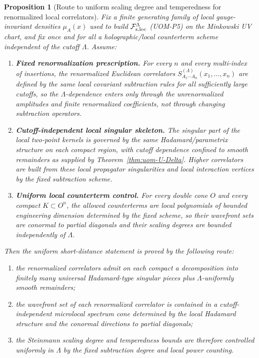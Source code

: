 \documentclass[10pt]{article}
\theoremstyle{definition}
\theoremstyle{plain}
\newtheorem{proposition}{Proposition}[section]
\begin{document}
\begin{proposition}[Route to uniform scaling degree and temperedness for renormalized local correlators]
\label{prop:uom-U-SD-route}
Fix a finite generating family of local gauge-invariant densities $\mu_A(x)$ used to build
$\mathcal F_{\rm s.loc}^\Lambda$ (UOM-P5) on the Minkowski UV chart, and fix once and for all a holographic/local counterterm scheme independent of
the cutoff $\Lambda$.  Assume:
\begin{enumerate}[label=\textnormal{(\roman*)},leftmargin=2.2em,itemsep=1pt]
\item \textbf{Fixed renormalization prescription.}
For every $n$ and every multi-index of insertions, the renormalized Euclidean correlators
\(
S^{(\Lambda)}_{A_1\cdots A_n}(x_1,\ldots,x_n)
\)
are defined by the same local covariant subtraction rules for all sufficiently large cutoffs, so the $\Lambda$-dependence enters only through the
unrenormalized amplitudes and finite renormalized coefficients, not through changing subtraction operators.
\item \textbf{Cutoff-independent local singular skeleton.}
The singular part of the local two-point kernels is governed by the same Hadamard/parametrix structure on each compact region, with cutoff dependence
confined to smooth remainders as supplied by Theorem~\ref{thm:uom-U-Delta}.  Higher correlators are built from these local propagator singularities and
local interaction vertices by the fixed subtraction scheme.
\item \textbf{Uniform local counterterm control.}
For every double cone $O$ and every compact $K\subset O^n$, the allowed counterterms are local polynomials of bounded engineering dimension determined by the fixed scheme, so their
wavefront sets are conormal to partial diagonals and their scaling degrees are bounded independently of $\Lambda$.
\end{enumerate}
Then the uniform short-distance statement is proved by the following route:
\begin{enumerate}[label=\textnormal{(S\arabic*)},leftmargin=2.4em,itemsep=1pt]
\item the renormalized correlators admit on each compact a decomposition into finitely many universal Hadamard-type singular pieces plus $\Lambda$-uniformly
smooth remainders;
\item the wavefront set of each renormalized correlator is contained in a cutoff-independent microlocal spectrum cone determined by the local Hadamard
structure and the conormal directions to partial diagonals;
\item the Steinmann scaling degree and temperedness bounds are therefore controlled uniformly in $\Lambda$ by the fixed subtraction degree and local
power counting.
\end{enumerate}
\end{proposition}
\end{document}
